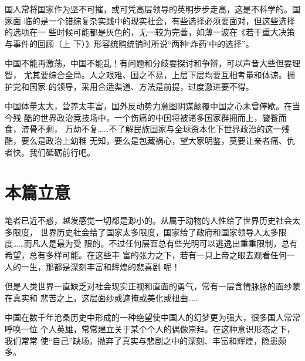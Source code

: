 国人常将国家作为坚不可摧，或可凭高层领导的英明步步走高，这是不科学的。国家面
临的是一个错综复杂实践中的现实社会，有些选择必须要面对，但这些选择的选项在一
些时候可能都是灰色的，无一较为完善，如薄一波在《若干重大决策与事件的回顾（上
下）》形容统购统销时所说“两种`炸药'中的选择”。

中国不能再激荡，中国不能乱！有问题和分歧要探讨和争辩，可以声音大些但要理智，
尤其要综合全局。人之艰难、国之不易，上层下层均要互相考量和体谅。拥护党和国家
的领导，采用合适渠道、方法是前提，过度激进要不得。

中国体量太大，营养太丰富，国外反动势力意图阴谋颠覆中国之心未曾停歇。在当今残
酷的世界政治竞技场中，一个伤痛的中国将被诸多国家群拥而上，饕餮而食，渣骨不剩，
万劫不复……不了解民族国家与全球资本化下世界政治的这一残酷，要么是政治上幼稚
无知，要么是包藏祸心，望大家明鉴，莫要让亲者痛、仇者快。我们砥砺前行吧。

\section{本篇立意}

笔者已近不惑，越发感觉一切都是渺小的。从属于动物的人性给了世界历史社会太多限度，
世界历史社会给了国家太多限度，国家给了政府和国家领导人太多限度……而凡人是最为受
限的。不过任何层面总有些光明可以逃逸出重重限制，总有希望，总有多样可能。在这些丰
富的张力之下，若有一只上帝之眼去观看任何一人的一生，那都是深刻丰富和辉煌的悲喜剧
呢！

但是人类世界一直缺乏对社会现实正视和直面的勇气，常有一层含情脉脉的面纱蒙在真实和
悲苦之上，这层面纱或遮掩或美化或扭曲……

中国在数千年沧桑历史中形成的一种绝望使中国人的幻梦更为强大，很多国人常常呼唤一位
个人英雄，常常建立关于某个个人的偶像崇拜。在这种意识形态之下，我们常常
使“自己”缺场，抛弃了真实与悲剧之中的深刻、丰富和辉煌，隐患颇多。






